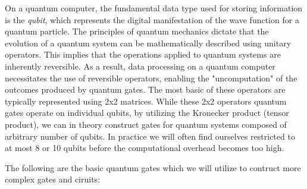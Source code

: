 \documentclass[onecolumn,10pt,cleanfoot]{asme2ej}
\begin{document}
On a quantum computer, the fundamental data type used for storing information is the \textit{qubit}, which represents the digital manifestation of the wave function for a quantum particle. The principles of quantum mechanics dictate that the evolution of a quantum system can be mathematically described using unitary operators. This implies that the operations applied to quantum systems are inherently reversible. As a result, data processing on a quantum computer necessitates the use of reversible operators, enabling the "uncomputation" of the outcomes produced by quantum gates. The most basic of these operators are typically represented using 2x2 matrices. While these 2x2 operators quantum gates operate on individual qubits, by utilizing the Kronecker product (tensor product), we can in theory construct gates for quantum systems composed of arbitrary number of qubits. In practice we will often find ourselves restricted to at most 8 or 10 qubits before the computational overhead becomes too high.

The following are the basic quantum gates which we will utilize to contruct more complex gates and ciruits: 
\end{document}

